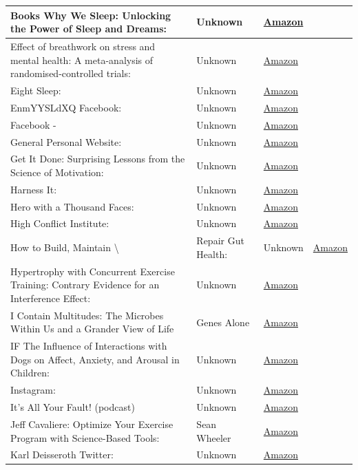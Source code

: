 \documentclass{article}
\begin{document}
\begin{longtable}{|p{8cm}|p{4cm}|p{2.5cm}|}
Books
Why We Sleep: Unlocking the Power of Sleep and Dreams: & Unknown & \href{https://amzn.to/3p2jDJD}{Amazon} \\
\hline
Effect of breathwork on stress and mental health: A meta-analysis of randomised-controlled trials: & Unknown & \href{https://amzn.to/2UZoudJ}{Amazon} \\
\hline
Eight Sleep: & Unknown & \href{https://amzn.to/4j4pus2}{Amazon} \\
\hline
EnmYYSLdXQ
Facebook: & Unknown & \href{https://amzn.to/3xWMNBO}{Amazon} \\
\hline
Facebook - & Unknown & \href{https://amzn.to/3FThTsG}{Amazon} \\
\hline
General 
Personal Website: & Unknown & \href{https://www.amazon.com/Together-Connection-Performance-Greater-Happiness/dp/0062913298}{Amazon} \\
\hline
Get It Done: Surprising Lessons from the Science of Motivation: & Unknown & \href{https://amzn.to/3q3u1VN}{Amazon} \\
\hline
Harness It: & Unknown & \href{https://amzn.to/3pRxtTu}{Amazon} \\
\hline
Hero with a Thousand Faces: & Unknown & \href{https://amzn.to/3xuzwQH}{Amazon} \\
\hline
High Conflict Institute: & Unknown & \href{https://amzn.to/48lNRNN}{Amazon} \\
\hline
How to Build, Maintain \textbackslash{}& Repair Gut Health: & Unknown & \href{https://amzn.to/4bBFHSo}{Amazon} \\
\hline
Hypertrophy with Concurrent Exercise Training: Contrary Evidence for an Interference Effect: & Unknown & \href{https://amzn.to/2D22cR9}{Amazon} \\
\hline
I Contain Multitudes: The Microbes Within Us and a Grander View of Life & Genes Alone & \href{https://amzn.to/3M2CY9B}{Amazon} \\
\hline
IF
The Influence of Interactions with Dogs on Affect, Anxiety, and Arousal in Children: & Unknown & \href{https://amzn.to/3A9S4UY}{Amazon} \\
\hline
Instagram: & Unknown & \href{https://amzn.to/43Rr1uX}{Amazon} \\
\hline
It’s All Your Fault! (podcast) & Unknown & \href{https://amzn.to/40lTU2J}{Amazon} \\
\hline
Jeff Cavaliere: Optimize Your Exercise Program with Science-Based Tools: & Sean Wheeler & \href{https://amzn.to/3JBR54b}{Amazon} \\
\hline
Karl Deisseroth
Twitter: & Unknown & \href{https://amzn.to/3diiKHG}{Amazon} \\

\end{longtable}
\end{document}
